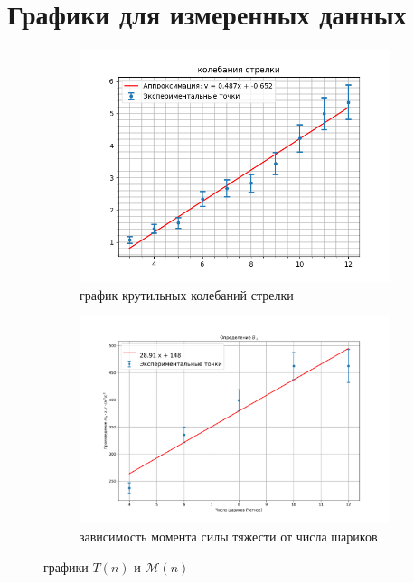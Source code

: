 \documentclass[a4paper, 10pt]{article}
\begin{document}
\section*{Графики для измеренных данных}
    \begin{figure}[htbp]
        \begin{subfigure}{0.45\textwidth}
            \includegraphics[width=\linewidth]{period.png}
            \caption{график крутильных колебаний стрелки}
            \label{горизонтальная составляющая}
        \end{subfigure}
        \begin{subfigure}{0.45\textwidth}
            \includegraphics[width=\linewidth]{vertical.png}
            \caption{зависимость момента силы тяжести от числа шариков}
            \label{вертикальная составляющая}
        \end{subfigure}
        \caption{графики $T(n)$ и $\mathcal{M}(n)$}
        \label{графики моментов и периодов}
    \end{figure}
\end{document}
